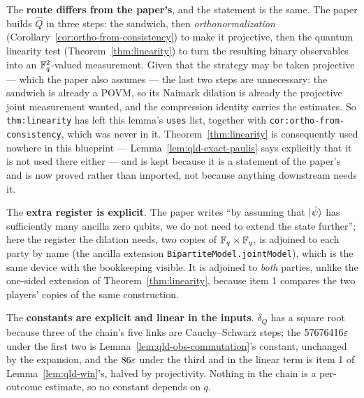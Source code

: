 The \textbf{route differs from the paper's}, and the statement is the same. The paper builds
$\widehat{Q}$ in three steps: the sandwich, then \emph{orthonormalization}
(Corollary~\ref{cor:ortho-from-consistency}) to make it projective, then the quantum linearity
test (Theorem~\ref{thm:linearity}) to turn the resulting binary observables into an $\mathbb{F}_q^2$-valued
measurement. Given that the strategy may be taken projective --- which the paper also assumes ---
the last two steps are unnecessary: the sandwich is already a POVM, so its Naimark dilation is
already the projective joint measurement wanted, and the compression identity carries the
estimates. So \texttt{thm:linearity} has left this lemma's \texttt{uses} list, together with
\texttt{cor:ortho-from-consistency}, which was never in it. Theorem~\ref{thm:linearity} is
consequently used nowhere in this blueprint --- Lemma~\ref{lem:qld-exact-paulis} says explicitly
that it is not used there either --- and is kept because it is a statement of the paper's and is
now proved rather than imported, not because anything downstream needs it.

The \textbf{extra register is explicit}. The paper writes ``by assuming that $|\hat\psi\rangle$ has
sufficiently many ancilla zero qubits, we do not need to extend the state further''; here the
register the dilation needs, two copies of $\mathbb{F}_q \times \mathbb{F}_q$, is adjoined to each party by name
(the ancilla extension \texttt{BipartiteModel.jointModel}), which is the same device with the
bookkeeping visible. It is adjoined to \emph{both} parties, unlike the
one-sided extension of Theorem~\ref{thm:linearity}, because item 1 compares the two players'
copies of the same construction.

The \textbf{constants are explicit and linear in the inputs}. $\delta_Q$ has a square root because
three of the chain's five links are Cauchy--Schwarz steps; the $57676416\varepsilon$ under the first two
is Lemma~\ref{lem:qld-obs-commutation}'s constant, unchanged by the expansion, and the $86\varepsilon$
under the third and in the linear term is item 1 of Lemma~\ref{lem:qld-win}'s, halved by
projectivity. Nothing in the chain is a per-outcome estimate, so no constant depends on $q$.

\effortHard

